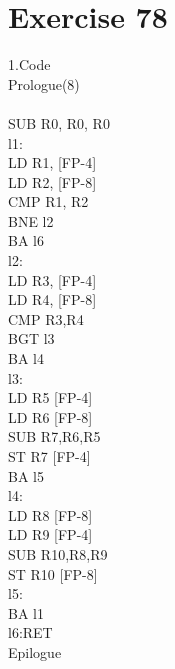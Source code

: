 \documentclass[10pt,a4paper]{article}
\begin{document}
\section{Exercise 78}
1.Code\\
Prologue(8)\\
\\
SUB R0, R0, R0\\
l1:\\
LD R1, [FP-4]\\
LD R2, [FP-8]\\
CMP R1, R2\\
BNE l2\\
BA l6\\
l2:\\
LD R3, [FP-4]\\
LD R4, [FP-8]\\
CMP R3,R4\\
BGT l3\\
BA l4\\
l3:\\
LD R5 [FP-4]\\
LD R6 [FP-8]\\
SUB R7,R6,R5\\
ST R7 [FP-4]\\
BA l5\\
l4:\\
LD R8 [FP-8]\\
LD R9 [FP-4]\\
SUB R10,R8,R9\\
ST R10 [FP-8]\\
l5:\\
BA l1\\
l6:RET\\
Epilogue
\end{document}
